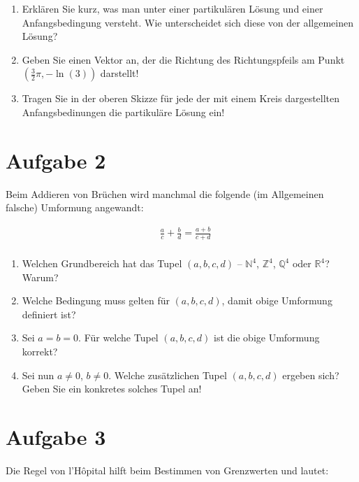 \documentclass[12pt]{article}
\begin{document}
\begin{enumerate}[label=(\alph*)]

\item Erklären Sie kurz, was man unter einer partikulären Lösung und einer Anfangsbedingung versteht. Wie unterscheidet sich diese von der allgemeinen Lösung?
 
\item Geben Sie einen Vektor an, der die Richtung des Richtungspfeils am Punkt $(\frac{3}{2}\pi, -\ln(3))$ darstellt!

\item Tragen Sie in der oberen Skizze für jede der mit einem Kreis dargestellten Anfangsbedinungen die partikuläre Lösung ein! 

\end{enumerate}

\newpage
\section* {Aufgabe 2}

Beim Addieren von Brüchen wird manchmal die folgende (im Allgemeinen falsche) Umformung angewandt:

\begin{align*}
&\frac{a}{c} + \frac{b}{d} = \frac{a+b}{c+d}\\
\end{align*}

\begin{enumerate}[label=(\alph*)]

\item Welchen Grundbereich hat das Tupel $(a, b, c, d)$ -- $\mathbb{N}^4$, $\mathbb{Z}^4$, $\mathbb{Q}^4$ oder $\mathbb{R}^4$? Warum?
\item Welche Bedingung muss gelten für $(a, b, c, d)$, damit obige Umformung definiert ist?
\item Sei $a=b=0$. Für welche Tupel $(a, b, c, d)$ ist die obige Umformung korrekt?
\item Sei nun $a \ne 0$, $b \ne 0$. Welche zusätzlichen Tupel $(a, b, c, d)$ ergeben sich? Geben Sie ein konkretes solches Tupel an!

\end{enumerate}

\newpage
\section* {Aufgabe 3}

Die Regel von l'Hôpital hilft beim Bestimmen von Grenzwerten und lautet:
\end{document}

